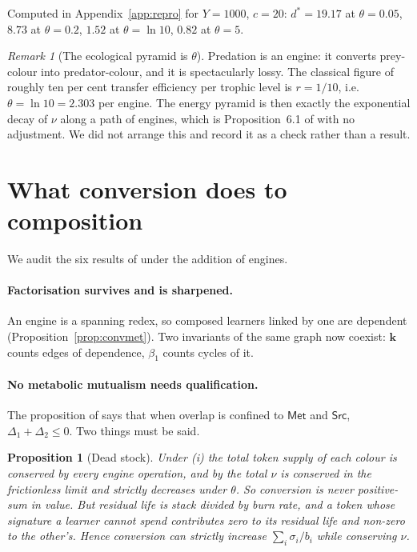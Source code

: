 \documentclass[11pt]{article}
\theoremstyle{plain}
\newtheorem{proposition}[theorem]{Proposition}
\theoremstyle{definition}
\theoremstyle{remark}
\newtheorem{remark}[theorem]{Remark}
\newcommand{\Met}{\mathsf{Met}}
\newcommand{\Src}{\mathsf{Src}}
\newcommand{\bt}{\beta_1}
\begin{document}
Computed in Appendix~\ref{app:repro} for $Y = 1000$, $c = 20$: $d^\ast =
19.17$ at $\theta = 0.05$, $8.73$ at $\theta = 0.2$, $1.52$ at $\theta =
\ln 10$, $0.82$ at $\theta = 5$.

\begin{remark}[The ecological pyramid is $\theta$]
Predation is an engine: it converts prey-colour into predator-colour, and
it is spectacularly lossy. The classical figure of roughly ten per cent
transfer efficiency per trophic level \cite{lindeman} is
$r = 1/10$, i.e.\ $\theta = \ln 10 = 2.303$ per engine. The energy pyramid
is then exactly the exponential decay of $\nu$ along a path of engines,
which is Proposition~6.1 of \cite{vtok} with no adjustment. We did not
arrange this and record it as a check rather than a result.
\end{remark}

\section{What conversion does to composition}
\label{sec:audit}

We audit the six results of \cite{compose} under the addition of engines.

\paragraph{Factorisation survives and is sharpened.} An engine is a
spanning redex, so composed learners linked by one are dependent
(Proposition~\ref{prop:convmet}). Two invariants of the same graph now
coexist: $\mathbf{k}$ counts edges of dependence, $\bt$ counts cycles of
it.

\paragraph{No metabolic mutualism needs qualification.} The proposition of
\cite[\S6.1]{compose} says that when overlap is confined to $\Met$ and
$\Src$, $\Delta_1 + \Delta_2 \leq 0$. Two things must be said.

\begin{proposition}[Dead stock]\label{prop:nomet2}
Under (i) the total token supply of each colour is conserved by every
engine operation, and by \cite[Prop.~5.1]{vtok} the total $\nu$ is
conserved in the frictionless limit and strictly decreases under $\theta$.
So conversion is never positive-sum in value. But residual life is stack
divided by burn rate, and a token whose signature a learner cannot spend
contributes zero to its residual life and non-zero to the other's. Hence
conversion can strictly increase $\sum_i \sigma_i / b_i$ while conserving
$\nu$.
\end{proposition}
\end{document}
